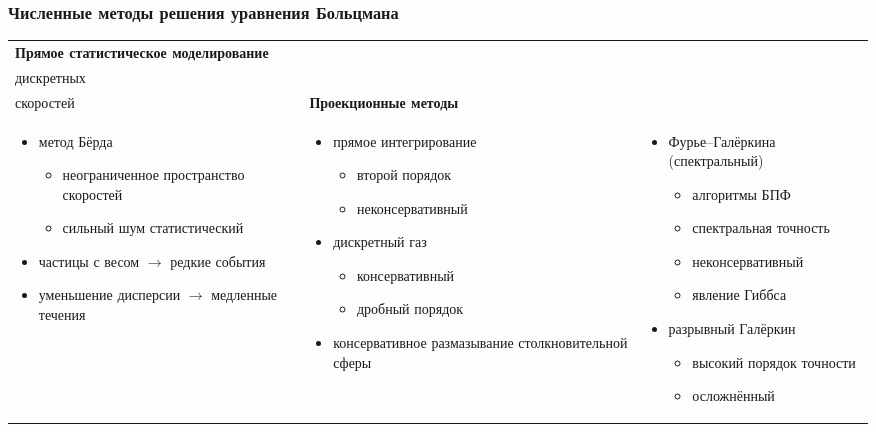 \documentclass[mathserif]{beamer} %
\newcommand\pro{\item[$+$]}
\newcommand\con{\item[$-$]}
\begin{document}
\begin{frame}
    \frametitle{Численные методы решения уравнения Больцмана}
    \setlength{\leftmarginii}{10pt}
    \setlength{\leftmarginiii}{\leftmarginii}
    \begin{adjustwidth}{-2.5em}{-2.5em}
    \centering
    \newcommand{\ColW}{}
    \begin{tabular}{>{\centering\arraybackslash}p{\ColW}>{\centering\arraybackslash}p{\ColW}>{\centering\arraybackslash}p{\ColW}}
		\centering\bfseries Прямое статистическое моделирование &
		\centering\bfseries {Методы\\дискретных\\скоростей} &
		{\centering\bfseries Проекционные методы} \\
		\begin{itemize}
            \item метод Бёрда
            \begin{itemize}
                \pro неограниченное пространство скоростей
                \con сильный шум статистический
            \end{itemize}
            \item частицы с весом \(\rightarrow\) редкие события
            \item уменьшение дисперсии \(\rightarrow\) медленные течения
        \end{itemize} &
		\begin{itemize}
            \item прямое интегрирование
            \begin{itemize}
                \pro второй порядок
                \con неконсервативный
            \end{itemize}
            \item дискретный газ
            \begin{itemize}
                \pro консервативный
                \con дробный порядок
            \end{itemize}
            \item \alert{консервативное размазывание столкновительной сферы}
        \end{itemize} &
		\begin{itemize}
            \item Фурье--Галёркина (спектральный)
            \begin{itemize}
                \pro алгоритмы БПФ
                \pro спектральная точность
                \con неконсервативный
                \con явление Гиббса
            \end{itemize}
            \item разрывный Галёркин
            \begin{itemize}
                \pro высокий порядок точности
                \con осложнённый
            \end{itemize}
        \end{itemize} \\
	\end{tabular}
    \end{adjustwidth}
\end{frame}
\end{document}

